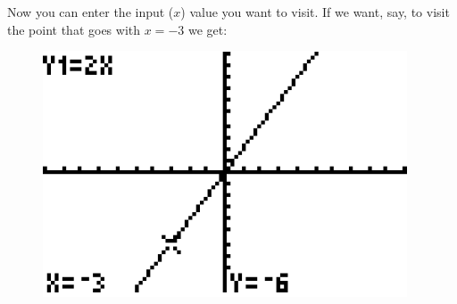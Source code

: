 Now you can enter the input ($x$) value you want to visit. If we want, say, to visit the point that goes with $x=-3$ we get:

\begin{figure}[H]
	\centering
	\includegraphics[scale=1.0]{Sections/FunctionsandGraphsImages/Figure28.png}
\end{figure}


